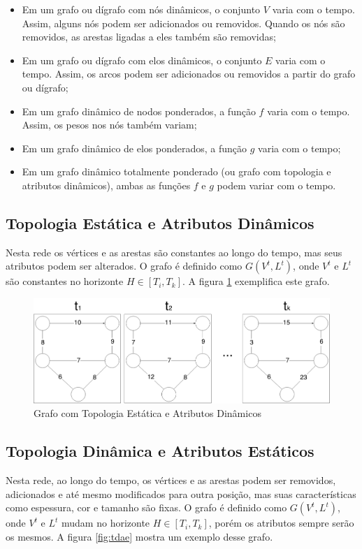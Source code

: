 \begin{itemize}
\item Em um grafo ou dígrafo com nós dinâmicos, o conjunto $V$ varia com o tempo. Assim, alguns nós podem
ser adicionados ou removidos. Quando os nós são removidos, as arestas ligadas a eles também são removidas; 
\item Em um grafo ou dígrafo com elos dinâmicos, o conjunto $E$ varia com o tempo. Assim, os arcos podem
ser adicionados ou removidos a partir do grafo ou dígrafo;
\item Em um grafo dinâmico de nodos ponderados, a função $f$ varia com o tempo. Assim, os pesos nos nós também variam;
\item Em um grafo dinâmico de elos ponderados, a função $g$ varia com o tempo;
\item Em um grafo dinâmico totalmente ponderado (ou grafo com topologia e atributos dinâmicos), ambas as funções $f$ e $g$
podem variar com o tempo.
\end{itemize}

\subsection{Topologia Estática e Atributos Dinâmicos}
Nesta rede os vértices e as arestas são constantes ao longo do tempo, mas seus atributos podem ser alterados.
O grafo é definido como $G(V^t, L^t)$, onde $V^t$ e $L^t$ são constantes no horizonte $H \in [T_i, T_k]$.
A figura \ref{fig:tead} exemplifica este grafo.

\begin{figure}[htbp]
\centering
 \includegraphics[width=.99\textwidth]{chapters/fig/tead.png}
\caption{Grafo com Topologia Estática e Atributos Dinâmicos}
\label{fig:tead}
\end{figure}

\subsection{Topologia Dinâmica e Atributos Estáticos}
Nesta rede, ao longo do tempo, os vértices e as arestas podem ser removidos, adicionados e até mesmo
modificados para outra posição, mas suas características como espessura, cor e tamanho são fixas.
O grafo é definido como $G(V^t, L^t)$, onde $V^t$ e $L^t$ mudam no horizonte $H \in [T_i, T_k]$,
porém os atributos sempre serão os mesmos. A figura \ref{fig:tdae} mostra um exemplo desse grafo.

